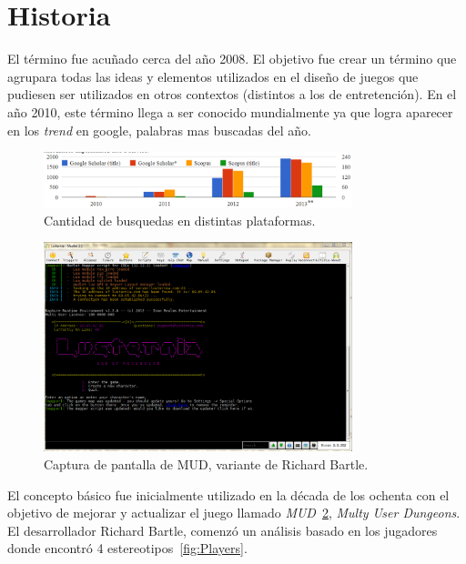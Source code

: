 \section{Historia}

El término {\GAM} fue acuñado cerca del año 2008\cite{DefineGamefication}.
El objetivo fue crear un término que agrupara todas las ideas y elementos
utilizados en el diseño de juegos que pudiesen ser utilizados en otros contextos
(distintos a los de entretención).
En el año 2010, este término llega a ser conocido mundialmente ya que logra
aparecer en los \emph{trend} en google\cite{LiCap1.3}, palabras mas buscadas
del año.

\begin{figure}[!htb]
  \centering
  \includegraphics[width=0.8\textwidth]{images/Busqueda.png}
  \caption[Cantidad de busqueda]{Cantidad de busquedas en distintas plataformas\cite{GamWorks}.}
  \label{fig:MudClient}
\end{figure}

\begin{figure}[!htb]
  \centering
  \includegraphics[width=0.8\textwidth]{images/mudclient.png}
  \caption[Captura de pantalla de juego MUD]{Captura de pantalla de MUD,
  variante de Richard Bartle.}
  \label{fig:MudClient}
\end{figure}

El concepto básico fue inicialmente utilizado en la década de los ochenta con el
objetivo de mejorar y actualizar el juego llamado \emph{MUD}~\ref{fig:MudClient},
\emph{Multy User Dungeons}.
El desarrollador Richard Bartle, comenzó un análisis basado en los jugadores
donde encontró 4 estereotipos~\ref{fig:Players}.

